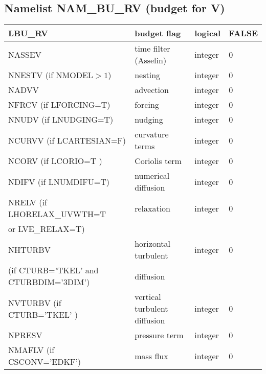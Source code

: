 \subsection{Namelist NAM\_BU\_RV (budget for V)}
\begin{center}
\begin{tabular} {|p{8cm}|p{4cm}|>{\centering}p{1.5cm}|p{1.5cm}<{\centering}|}
\hline
LBU\_RV  & budget flag & logical & FALSE \index{LBU\_RV!\innam{NAM\_BU\_RV}}\\\hline
NASSEV   & time filter (Asselin)   & integer  &  0 \index{NASSEV!\innam{NAM\_BU\_RV}} \\\hline
NNESTV (if NMODEL$>1$)  & nesting           & integer  &  0 \index{NNESTV!\innam{NAM\_BU\_RV}} \\\hline
NADVV   & advection  & integer  &  0  \index{NADVV!\innam{NAM\_BU\_RV}}\\\hline
NFRCV (if LFORCING=T)  & forcing           & integer  &  0 \index{NFRCV!\innam{NAM\_BU\_RV}} \\\hline
NNUDV (if LNUDGING=T)   & nudging           & integer  &  0 \index{NNUDV!\innam{NAM\_BU\_RV}} \\\hline
NCURVV (if LCARTESIAN=F)  & curvature terms   & integer  &  0 \index{NCURVV!\innam{NAM\_BU\_RV}}\\\hline
NCORV (if LCORIO=T )   & Coriolis  term    & integer  &  0 \index{NCORV!\innam{NAM\_BU\_RV}}\\\hline
NDIFV (if LNUMDIFU=T)   & numerical diffusion & integer  &  0 \index{NDIFV!\innam{NAM\_BU\_RV}}\\\hline
NRELV  (if LHORELAX\_UVWTH=T  & relaxation & integer  &  0 \index{NRELV!\innam{NAM\_BU\_RV}}\\
or LVE\_RELAX=T) &  &   &   \\\hline
NHTURBV  & horizontal turbulent & integer  &  0 \index{NHTURBV!\innam{NAM\_BU\_RV}}\\
(if CTURB='TKEL' and CTURBDIM='3DIM') &diffusion &   &  \\\hline
NVTURBV (if CTURB='TKEL' ) & vertical turbulent diffusion & integer  &  0 \index{NVTURBV!\innam{NAM\_BU\_RV}}\\\hline
NPRESV   & pressure term       & integer  &  0 \index{NPRESV!\innam{NAM\_BU\_RV}}    \\\hline
NMAFLV (if CSCONV='EDKF')   & mass flux        & integer  &  0 \index{NMAFLV!\innam{NAM\_BU\_RV}}\\
\hline
\end{tabular}
\end{center}

